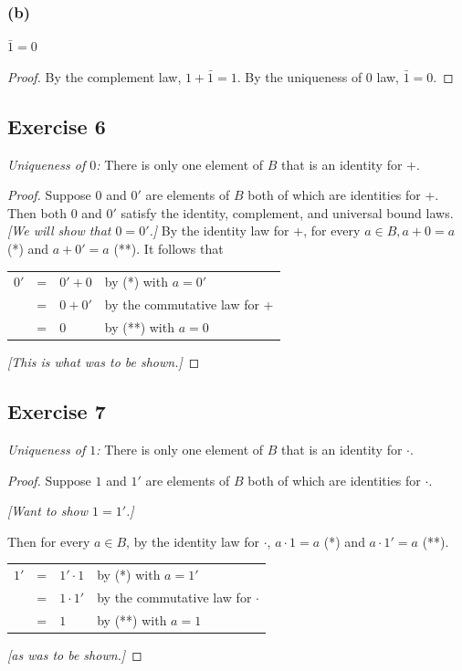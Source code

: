 \documentclass[14pt]{extarticle}
\newcommand{\cy}{\color{cyan}}
\begin{document}
\subsubsection{(b)}
\(\bar{1} = 0\)

\begin{proof}
By the complement law, \(1 + \bar{1} = 1\). By the uniqueness of 0 law, \(\bar{1} = 0\).
\end{proof}

\subsection{Exercise 6}
{\it Uniqueness of $0$:} There is only one element of $B$ that is an identity for $+$.

\begin{proof}
Suppose $0$ and $0'$ are elements of $B$ both of which are identities for +. Then both $0$ and $0'$ satisfy the 
identity, complement, and universal bound laws. {\it [We will show that $0 = 0'$.]} By the identity law for +, for 
every \(a \in B, a + 0 = a\) (*) and \(a + 0' = a\) (**). It follows that

\begin{center}
\begin{tabular}{rcll}
\(0'\) & = & \(0' + 0\) & {\cy by (*) with \(a = 0'\)} \\
& = & \(0 + 0'\) & {\cy by the commutative law for +} \\
& = & \(0\) & {\cy by (**) with \(a = 0\)}
\end{tabular}
\end{center}

{\it [This is what was to be shown.]}
\end{proof}

\subsection{Exercise 7}
{\it Uniqueness of $1$:} There is only one element of $B$ that is an identity for $\cdot$.

\begin{proof}
Suppose $1$ and $1'$ are elements of $B$ both of which are identities for $\cdot$. 

{\it [Want to show $1 = 1'$.]}

Then for every \(a \in B\), by the identity law for $\cdot$, \(a \cdot 1 = a\) (*) and \(a \cdot 1' = a\) (**). 

\begin{center}
\begin{tabular}{rcll}
\(1'\) & = & \(1' \cdot 1\) & {\cy by (*) with \(a=1'\)} \\
& = & \(1 \cdot 1'\) & {\cy by the commutative law for $\cdot$} \\
& = & \(1\) & {\cy by (**) with \(a = 1\)}
\end{tabular}
\end{center}

{\it [as was to be shown.]}
\end{proof}
\end{document}
